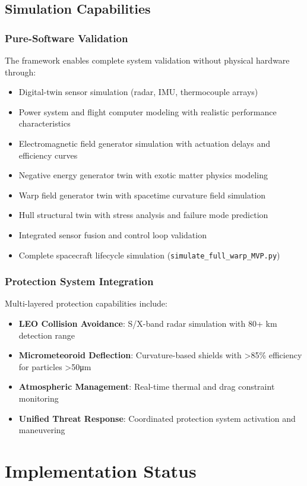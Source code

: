 \documentclass[11pt]{article}
\begin{document}
\subsection{Simulation Capabilities}

\subsubsection{Pure-Software Validation}
The framework enables complete system validation without physical hardware through:
\begin{itemize}
\item Digital-twin sensor simulation (radar, IMU, thermocouple arrays)
\item Power system and flight computer modeling with realistic performance characteristics
\item Electromagnetic field generator simulation with actuation delays and efficiency curves
\item Negative energy generator twin with exotic matter physics modeling
\item Warp field generator twin with spacetime curvature field simulation
\item Hull structural twin with stress analysis and failure mode prediction
\item Integrated sensor fusion and control loop validation
\item Complete spacecraft lifecycle simulation (\texttt{simulate\_full\_warp\_MVP.py})
\end{itemize}

\subsubsection{Protection System Integration}
Multi-layered protection capabilities include:
\begin{itemize}
\item \textbf{LEO Collision Avoidance}: S/X-band radar simulation with 80+ km detection range
\item \textbf{Micrometeoroid Deflection}: Curvature-based shields with >85\% efficiency for particles >50μm
\item \textbf{Atmospheric Management}: Real-time thermal and drag constraint monitoring
\item \textbf{Unified Threat Response}: Coordinated protection system activation and maneuvering
\end{itemize}

\section{Implementation Status}
\end{document}
